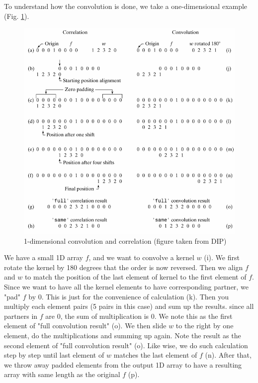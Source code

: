 To understand how the convolution is done, we take a one-dimensional
example (Fig. \ref{fig:img39}).


\begin{figure}[htbp]
\begin{center}
\includegraphics[width=11.718cm]{fig/CMCIBasicCourse201102-img39.png}
\caption{ 1-dimensional convolution and correlation (figure taken from DIP)}
\label{fig:img39}
\end{center}
\end{figure}

We have a small 1D array $f$, and we want to convolve a
kernel $w$ (i). We first rotate the kernel by 180 degrees that
the order is now reversed. Then we align $f$ and $w$ to
match the position of the last element of kernel to the first element
of $f$. Since we want to have all the kernel elements to have
corresponding partner, we "pad" $f$ by 0.
This is just for the convenience of calculation (k). Then you multiply
each element pairs (5 pairs in this case) and sum up the results. since
all partners in $f$ are 0, the sum of multiplication is 0. We note this
as the first element of "full convolution
result" (o). We then slide $w$ to the right by one
element, do the multiplications and summing up again. Note the result
as the second element of "full convolution
result" (o). Like wise, we do such calculation step by
step until last element of $w$ matches the last element of
$f$ (n). After that, we throw away padded elements from the
output 1D array to have a resulting array with same length as the
original $f$ (p). 

